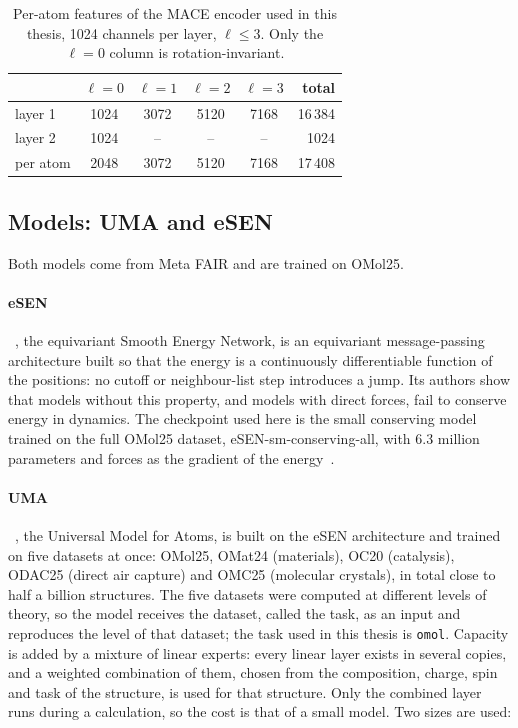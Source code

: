 \begin{table}[h]
\centering
\caption{Per-atom features of the MACE encoder used in this thesis, 1024
channels per layer, $\ell \le 3$. Only the $\ell = 0$ column is
rotation-invariant.}
\label{tab:mace-features}
\begin{tabular}{@{}lccccr@{}}
\toprule
 & $\ell = 0$ & $\ell = 1$ & $\ell = 2$ & $\ell = 3$ & total \\
\midrule
layer 1 & 1024 & 3072 & 5120 & 7168 & 16\,384 \\
layer 2 & 1024 & --   & --   & --   & 1024 \\
\midrule
per atom & 2048 & 3072 & 5120 & 7168 & 17\,408 \\
\bottomrule
\end{tabular}
\end{table}

\subsection{Models: UMA and eSEN}
\label{sec:model-uma-esen}

Both models come from Meta FAIR and are trained on OMol25.

\paragraph{eSEN}~\cite{esen}, the equivariant Smooth Energy Network, is an
equivariant message-passing architecture built so that the energy is a
continuously differentiable function of the positions: no cutoff or
neighbour-list step introduces a jump. Its authors show that models
without this property, and models with direct forces, fail to conserve
energy in dynamics. The checkpoint used here is the small conserving
model trained on the full OMol25 dataset, eSEN-sm-conserving-all, with
6.3 million parameters and forces as the gradient of the
energy~\cite{omol25}.

\paragraph{UMA}~\cite{uma}, the Universal Model for Atoms, is built on
the eSEN architecture and trained on five datasets at once: OMol25,
OMat24 (materials), OC20 (catalysis), ODAC25 (direct air capture) and
OMC25 (molecular crystals), in total close to half a billion structures.
The five datasets were computed at different levels of theory, so the
model receives the dataset, called the task, as an input and reproduces
the level of that dataset; the task used in this thesis is \texttt{omol}.
Capacity is added by a mixture of linear experts: every linear layer
exists in several copies, and a weighted combination of them, chosen
from the composition, charge, spin and task of the structure, is used for
that structure. Only the combined layer runs during a calculation, so
the cost is that of a small model. Two sizes are used:

